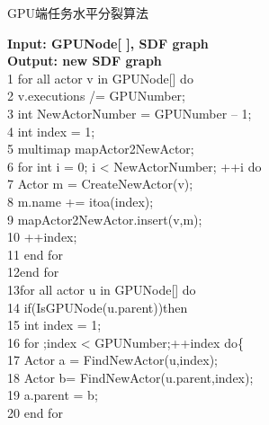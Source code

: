 \begin{breakablealgorithm} \label{algo:gths}
  \caption{GPU端任务水平分裂算法}
  {\bf Input: GPUNode[ ], SDF graph}\\
  {\bf Output: new SDF graph}\\
  1 for all actor v in GPUNode[] do\\
  2   \hspace*{1 pc} v.executions /= GPUNumber;\\
  3   \hspace*{1 pc} int NewActorNumber = GPUNumber – 1;\\
  4   \hspace*{1 pc} int index = 1;\\
  5   \hspace*{1 pc} multimap mapActor2NewActor;\\
  6   \hspace*{1 pc} for int i = 0; i < NewActorNumber; ++i do\\
  7   \hspace*{2 pc} Actor m = CreateNewActor(v);\\
  8   \hspace*{2 pc} m.name += itoa(index);\\
  9   \hspace*{2 pc} mapActor2NewActor.insert(v,m);\\
  10  \hspace*{2 pc} ++index;\\
  11  \hspace*{1 pc} end for\\
  12end for\\
  13for all actor u in GPUNode[] do\\
  14  \hspace*{1 pc} if(IsGPUNode(u.parent))then\\
  15  \hspace*{2 pc} int index = 1;\\
  16  \hspace*{2 pc} for ;index < GPUNumber;++index do\{\\
  17  \hspace*{3 pc} Actor a = FindNewActor(u,index);\\
  18  \hspace*{3 pc} Actor b= FindNewActor(u.parent,index);\\
  19  \hspace*{3 pc} a.parent = b;\\
  20  \hspace*{2 pc} end for\\

\end{breakablealgorithm}
